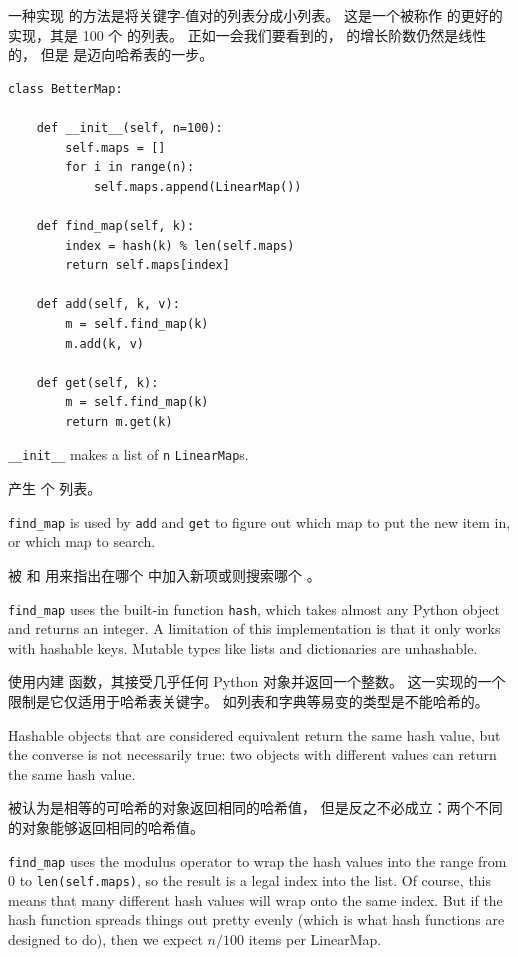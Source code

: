 一种实现  的方法是将关键字-值对的列表分成小列表。
这是一个被称作  的更好的实现，其是 100 个  的列表。
正如一会我们要看到的， 的增长阶数仍然是线性的，
但是  是迈向哈希表的一步。

\begin{lstlisting}
class BetterMap:

    def __init__(self, n=100):
        self.maps = []
        for i in range(n):
            self.maps.append(LinearMap())

    def find_map(self, k):
        index = hash(k) % len(self.maps)
        return self.maps[index]

    def add(self, k, v):
        m = self.find_map(k)
        m.add(k, v)

    def get(self, k):
        m = self.find_map(k)
        return m.get(k)
\end{lstlisting}

\verb"__init__" makes a list of {\tt n} {\tt LinearMap}s.

 产生  个  列表。

\verb"find_map" is used by
{\tt add} and {\tt get}
to figure out which map to put the
new item in, or which map to search.

 被  和  用来指出在哪个  中加入新项或则搜索哪个 。

\verb"find_map" uses the built-in function {\tt hash}, which takes
almost any Python object and returns an integer.  A limitation of this
implementation is that it only works with hashable keys.  Mutable
types like lists and dictionaries are unhashable.

 使用内建  函数，其接受几乎任何 Python 对象并返回一个整数。
这一实现的一个限制是它仅适用于哈希表关键字。 如列表和字典等易变的类型是不能哈希的。

Hashable objects that are considered equivalent return the same hash
value, but the converse is not necessarily true: two objects with
different values can return the same hash value.

被认为是相等的可哈希的对象返回相同的哈希值，
但是反之不必成立：两个不同的对象能够返回相同的哈希值。

\verb"find_map" uses the modulus operator to wrap the hash values
into the range from 0 to {\tt len(self.maps)}, so the result is a legal
index into the list.  Of course, this means that many different
hash values will wrap onto the same index.  But if the hash function
spreads things out pretty evenly (which is what hash functions
are designed to do), then we expect $n/100$ items per LinearMap.

